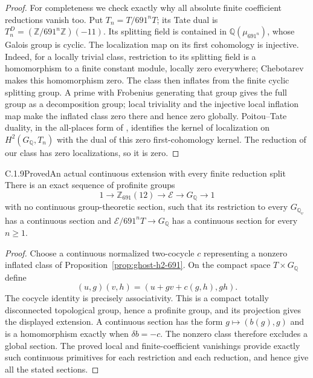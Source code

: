 \begin{proof}
For completeness we check exactly why all absolute finite
coefficient reductions vanish too. Put
\(T_n=T/691^nT\); its Tate dual is
\(T_n^D=(\mathbb Z/691^n\mathbb Z)(-11)\). Its splitting
field is contained in \(\mathbb Q(\mu_{691^n})\), whose Galois
group is cyclic. The localization map on its first cohomology
is injective. Indeed, for a locally trivial class, restriction
to its splitting field is a homomorphism to a finite constant
module, locally zero everywhere; Chebotarev makes this
homomorphism zero. The class then inflates from the finite
cyclic splitting group. A prime with Frobenius generating
that group gives the full group as a decomposition group;
local triviality and the injective local inflation map make
the inflated class zero there and hence zero globally.
Poitou--Tate duality, in the all-places form of
\cite[I.4.10]{GhostMilneADT}, identifies the kernel of
localization on \(H^2(G_{\mathbb Q},T_n)\) with the dual
of this zero first-cohomology kernel. The reduction of our
class has zero localizations, so it is zero.
\end{proof}

\begin{result}{C.1.9}{Proved}{An actual continuous extension with every finite reduction split}
\label{cor:ghost-integral-extension}
There is an exact sequence of profinite groups
\[
  1\longrightarrow\mathbb Z_{691}(12)
    \longrightarrow\mathcal E\longrightarrow G_{\mathbb Q}
    \longrightarrow1
\]
with no continuous group-theoretic section, such that its
restriction to every \(G_{\mathbb Q_v}\) has a continuous
section and \(\mathcal E/691^nT\to G_{\mathbb Q}\) has a
continuous section for every \(n\geq1\).
\end{result}
\begin{proof}
Choose a continuous normalized two-cocycle \(c\) representing
a nonzero inflated class of Proposition~\ref{prop:ghost-h2-691}.
On the compact space \(T\times G_{\mathbb Q}\) define
\[
 (u,g)(v,h)=(u+g v+c(g,h),gh).
\]
The cocycle identity is precisely associativity. This is a
compact totally disconnected topological group, hence a
profinite group, and its projection gives the displayed
extension. A continuous section has the form \(g\mapsto(b(g),g)\)
and is a homomorphism exactly when \(\delta b=-c\).
The nonzero class therefore excludes a global section. The
proved local and finite-coefficient vanishings provide exactly
such continuous primitives for each restriction and each
reduction, and hence give all the stated sections.
\end{proof}

